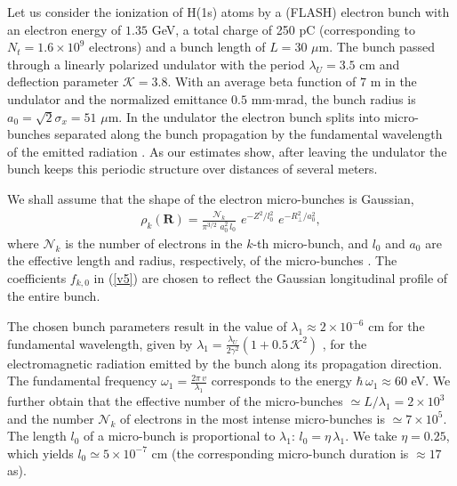 \documentclass[prl, twocolumn, floatfix]{revtex4}
\begin{document}
Let us consider the ionization of H(1s) atoms by a (FLASH) electron bunch
with an electron energy of $1.35$ GeV,
a total charge of 250
pC (corresponding to $ N_t = 1.6 \times 10^9$  electrons) and a
bunch length of $L = 30 $ $\mu$m. The bunch passed through
a linearly polarized undulator with the period $ \lambda_U = 3.5 $ cm
and deflection parameter $ \mathcal{ K } = 3.8$.
With an average beta function of $7$ m in the undulator
and the normalized emittance \cite{linac}
$0.5$ mm$ \cdot $mrad,
the bunch radius is $ a_0 = \sqrt{2} \sigma_x = 51$ $\mu$m.
In the undulator
the electron bunch splits into micro-bunches
separated along the bunch propagation by the fundamental wavelength
of the emitted radiation \cite{FEL1}.
As our estimates show,
after leaving the undulator the bunch keeps this periodic structure
over distances of several meters.

We shall assume that the shape of the electron micro-bunches is Gaussian,
\begin{eqnarray}
\rho_{k}( \bm R) = \frac{ \mathcal{N}_k }{ \pi^{3/2} \, \, a_0^2 \, l_0   } \,
\, e^{- Z^2/l_0^2 }  \, \, e^{ - R_\perp^2/a_0^2},
\label{v7}
\end{eqnarray}
where $ \mathcal{N}_k $ is the number of electrons in the $k$-th micro-bunch, and
$ l_0 $ and $ a_0 $ are the effective length and radius, respectively,
of the micro-bunches \cite{rms}. The coefficients $ f_{k,0} $ in (\ref{v5})
are chosen to reflect the Gaussian longitudinal profile of the entire bunch.

The chosen bunch parameters result in the value of
$ \lambda_1 \approx 2 \times 10^{-6} $   cm for
the fundamental wavelength, given by
$ \lambda_1 = \frac{ \lambda_U }{ 2 \gamma^2 } (1 + 0.5 \, \mathcal{ K }^2) $
\cite{FEL1},
for the electromagnetic radiation emitted by
the bunch along its propagation direction.
The fundamental frequency $\omega_1 = \frac{2 \pi \, v}{ \lambda_1 } $
corresponds to the energy $ \hbar \, \omega_1 \approx 60 $ eV.
We further obtain that the effective number
of the micro-bunches $ \simeq L/\lambda_1  = 2 \times 10^3 $ and
the number $\mathcal{N}_k$ of electrons in the most intense micro-bunches is
$ \simeq 7 \times 10^5 $. The length $l_0$ of a micro-bunch is proportional to
$ \lambda_1 $: $l_0 = \eta \, \lambda_1 $. We take $\eta = 0.25$, which yields
$ l_0 \simeq  5 \times 10^{-7}$ cm
(the corresponding micro-bunch duration is $ \approx 17 $ as).
\end{document}
